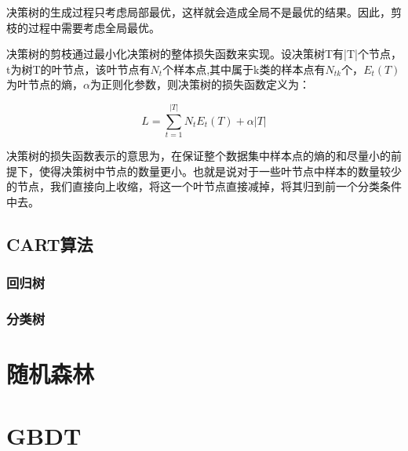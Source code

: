 	决策树的生成过程只考虑局部最优，这样就会造成全局不是最优的结果。因此，剪枝的过程中需要考虑全局最优。
	
	决策树的剪枝通过最小化决策树的整体损失函数来实现。设决策树T有|T|个节点，t为树T的叶节点，该叶节点有$N_t$个样本点,其中属于k类的样本点有$N_{tk}$个，$E_t(T)$为叶节点的熵，$\alpha$为正则化参数，则决策树的损失函数定义为：
	
	\begin{equation}
	L = \sum _{t=1} ^{|T|}N_t E_t(T) + \alpha |T|
	\end{equation}
	
	决策树的损失函数表示的意思为，在保证整个数据集中样本点的熵的和尽量小的前提下，使得决策树中节点的数量更小。也就是说对于一些叶节点中样本的数量较少的节点，我们直接向上收缩，将这一个叶节点直接减掉，将其归到前一个分类条件中去。
	
	\subsection{CART算法}
	\subsubsection{回归树}
	\subsubsection{分类树}
	
\section{随机森林}




\section{GBDT}	
	
	
	
	
	
	
	